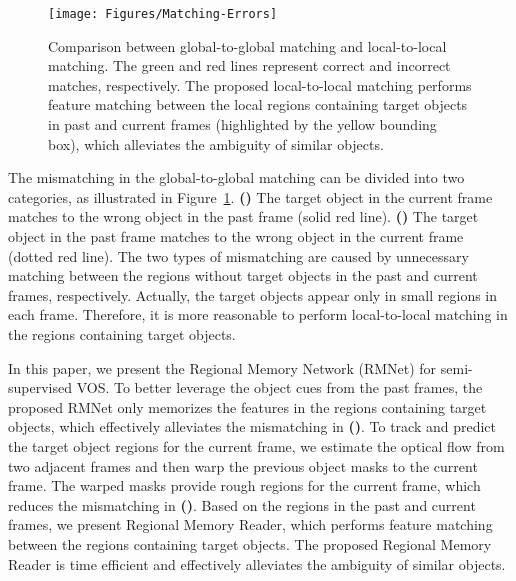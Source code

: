 \documentclass[final]{cvpr}
\begin{document}
\begin{figure}
  \resizebox{\linewidth}{!} {
    \texttt{[image: Figures/Matching-Errors]}
  }
  \caption{Comparison between global-to-global matching and local-to-local matching. The green and red lines represent correct and incorrect matches, respectively. The proposed local-to-local matching performs feature matching between the local regions containing target objects in past and current frames (highlighted by the yellow bounding box), which alleviates the ambiguity of similar objects.}
  \label{fig:matching-errors}
  \vspace{-2 mm}
\end{figure}

The mismatching in the global-to-global matching can be divided into two categories, as illustrated in Figure~\ref{fig:matching-errors}.
\textbf{()} The target object in the current frame matches to the wrong object in the past frame (solid red line).
\textbf{()} The target object in the past frame matches to the wrong object in the current frame (dotted red line).
The two types of mismatching are caused by unnecessary matching between the regions without target objects in the past and current frames, respectively.
Actually, the target objects appear only in small regions in each frame.
Therefore, it is more reasonable to perform local-to-local matching in the regions containing target objects.


In this paper, we present the Regional Memory Network (RMNet) for semi-supervised VOS.
To better leverage the object cues from the past frames, the proposed RMNet only memorizes the features in the regions containing target objects, which effectively alleviates the mismatching in \textbf{()}.
To track and predict the target object regions for the current frame, we estimate the optical flow from two adjacent frames and then warp the previous object masks to the current frame.
The warped masks provide rough regions for the current frame, which reduces the mismatching in \textbf{()}.
Based on the regions in the past and current frames, we present Regional Memory Reader, which performs feature matching between the regions containing target objects.
The proposed Regional Memory Reader is time efficient and effectively alleviates the ambiguity of similar objects.
\end{document}
